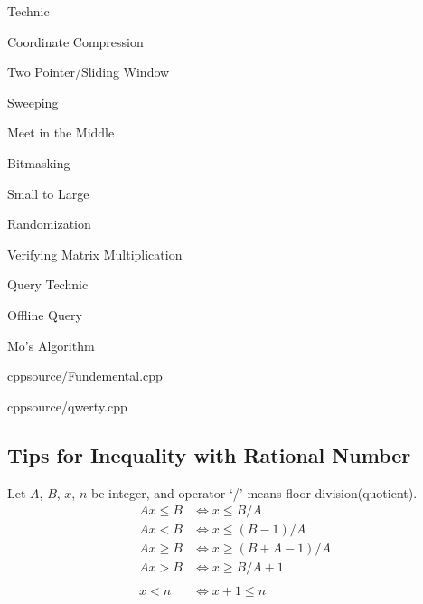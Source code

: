 \documentclass[landscape, 8pt, a4paper, oneside]{extarticle}
\begin{document}
\begin{multicols}{3}
\begin{tcolorbox}[breakable, enhanced, sharp corners, colback=white, colframe=black, boxrule=1pt, left=0pt]
\begin{IdeaNote}
\item Technic
    \begin{IdeaNote}
    \item Coordinate Compression
    \item Two Pointer/Sliding Window
    \item Sweeping
    \item Meet in the Middle
    \item Bitmasking
    \item Small to Large
    \item Randomization
        \begin{IdeaNote}
        \item Verifying Matrix Multiplication
        \end{IdeaNote}
    \item Query Technic
        \begin{IdeaNote}
        \item Offline Query
            \begin{IdeaNote}
            \item Mo's Algorithm
            \end{IdeaNote}
        \end{IdeaNote}
    \end{IdeaNote}

\end{IdeaNote}

\end{tcolorbox}

{}{}{cpp}{source/Fundemental.cpp}

{}{}{cpp}{source/qwerty.cpp}

\subsection{Tips for Inequality with Rational Number}
Let $A$, $B$, $x$, $n$ be integer, and operator `/' means floor division(quotient).
\begin{align*}
    Ax \leqslant B & \Leftrightarrow  x \leqslant B/A \\
    Ax < B & \Leftrightarrow  x \leqslant (B-1)/A \\
    Ax \geqslant B & \Leftrightarrow  x \geqslant (B+A-1)/A \\
    Ax > B & \Leftrightarrow  x \geqslant B/A+1 \\ \\
    x < n & \Leftrightarrow x+1\leqslant n
\end{align*}


\end{multicols}
\end{document}
